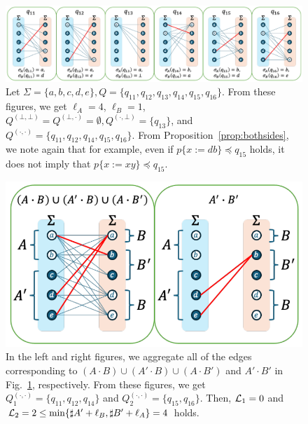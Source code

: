 \documentclass[a4paper]{article}
\begin{document}

\newpage

\begin{figure}[t]
  \begin{center}
    \includegraphics[scale=0.54]{figs/lem11-prop4-eachreg2.pdf}
    \caption{Let $\Sigma=\{a,b,c,d,e\}, Q=\{q_{11},q_{12},q_{13},q_{14},q_{15},q_{16}\}$. From these figures, we get $\ell_A=4$, $\ell_B=1$, $Q^{(\bot,\bot)}=Q^{(\bot,\cdot)}=\emptyset, Q^{(\cdot,\bot)}=\{q_{13}\}$, and $Q^{(\cdot,\cdot)}=\{q_{11},q_{12},q_{14},q_{15},q_{16}\}$. From Proposition~\ref{prop:bothsides}, we note again that for example, even if $p \{ x:=db \} \preceq q_{15}$ holds, it does not imply that $p \{ x:=xy \} \preceq q_{15}$.}\label{fig:lem11-prop4-eachreg2}
  \end{center}
\end{figure}

\begin{figure}[t]
  \begin{center}
    \includegraphics[scale=0.525]{figs/lem11-prop4-totalreg2.pdf}
    \caption{In the left and right figures, we aggregate all of the edges corresponding to $(A\cdot B)\cup (A'\cdot B)\cup (A\cdot B')$ and $A'\cdot B'$ in Fig.~\ref{fig:lem11-prop4-eachreg2}, respectively. From these figures, we get $Q_{1}^{(\cdot,\cdot)}=\{q_{11},q_{12},q_{14}\}$ and $Q_{2}^{(\cdot,\cdot)}=\{q_{15},q_{16}\}$. Then, ${\cal L}_{1} = 0$ and ${\cal L}_{2} = 2 \leq \min\{\sharp A' + \ell_B, \sharp B' + \ell_A\} = 4$ holds.}\label{fig:lem11-prop4-totalreg2}
  \end{center}
\end{figure}
\end{document}
